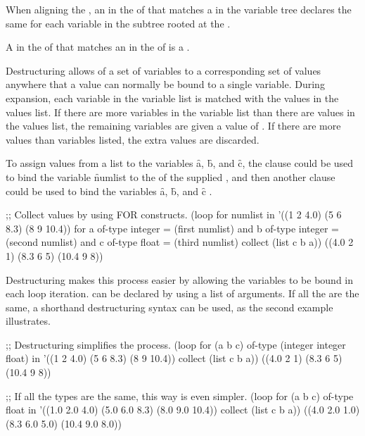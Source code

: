 \beginlist 
\itemitem{\bull}
When aligning the , an  in the
 of  that matches a  
in the variable tree declares the same  for each variable
in the subtree rooted at the .
 
\itemitem{\bull} 
A  in the  of  that 
matches an  in the  of  
is a  .
 
\endlist
 
Destructuring allows  of a set of variables to a corresponding
set of values anywhere that a value can normally be bound to a single
variable.  During  expansion, 
each variable in the variable list
is matched with the values in the values list.  If there are more variables
in the variable list than there are values in the values list, the 
remaining variables are given a value of \nil.  If there are more
values than variables listed, the extra values are discarded.

 
To assign values from a list to the variables \f{a},
\f{b}, and \f{c}, the  clause could be used to
bind the variable \f{numlist} to the 
 of the supplied ,
and then another  clause could be used to bind the variables
\f{a}, \f{b}, and \f{c} .  

\code
;; Collect values by using FOR constructs.
 (loop for numlist in '((1 2 4.0) (5 6 8.3) (8 9 10.4))
       for a of-type integer = (first numlist)
       and b of-type integer = (second numlist)
       and c of-type float = (third numlist)
       collect (list c b a))
\EV ((4.0 2 1) (8.3 6 5) (10.4 9 8))
\endcode
{}
 
Destructuring makes this process easier by allowing the variables to
be bound in each loop iteration.  
 can be declared by using a 
list of  arguments.  If 
all the 
are the same, a shorthand destructuring syntax can be used, as the second
example illustrates.

\code
;; Destructuring simplifies the process.
 (loop for (a b c) of-type (integer integer float) in
       '((1 2 4.0) (5 6 8.3) (8 9 10.4))
       collect (list c b a))
\EV ((4.0 2 1) (8.3 6 5) (10.4 9 8))
 

;; If all the types are the same, this way is even simpler.
 (loop for (a b c) of-type float in
       '((1.0 2.0 4.0) (5.0 6.0 8.3) (8.0 9.0 10.4))
       collect (list c b a))
\EV ((4.0 2.0 1.0) (8.3 6.0 5.0) (10.4 9.0 8.0))
\endcode
 
